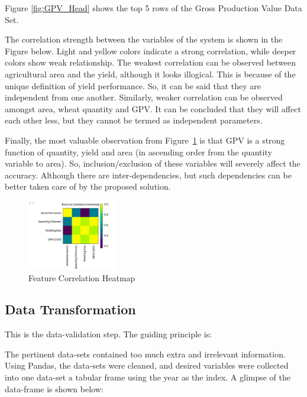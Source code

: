 Figure \ref{fig:GPV_Head} shows the top 5 rows of the Gross Production Value Data Set.


The correlation strength between the variables of the system is shown in the Figure below. Light and yellow colors indicate a strong correlation, while deeper colors show weak relationship. The weakest correlation can be observed between agricultural area and the yield, although it looks illogical. This is because of the unique definition of yield performance. So, it can be said that they are independent from one another. Similarly, weaker correlation can be observed amongst area, wheat quantity and GPV. It can be concluded that they will affect each other less, but they cannot be termed as independent parameters.  

Finally, the most valuable observation from Figure~\ref{fig:Corr} is that GPV is a strong function of quantity, yield and area (in ascending order from the quantity variable to area). So, inclusion/exclusion of these variables will severely affect the accuracy. Although there are inter-dependencies, but such dependencies can be better taken care of by the proposed solution.


\begin{figure}[h!]
	\centering
	\includegraphics[width=0.35\textwidth]{fig/correlation.png}
	\caption{Feature Correlation Heatmap}
	\label{fig:Corr}
\end{figure}


 




\subsection{Data Transformation} 

This is the data-validation step. The guiding principle is: 




The pertinent data-sets contained too much extra and irrelevant information. Using Pandas, the data-sets were cleaned, and desired variables were collected into one data-set a tabular frame using the year as the index. A glimpse of the data-frame is shown below:

